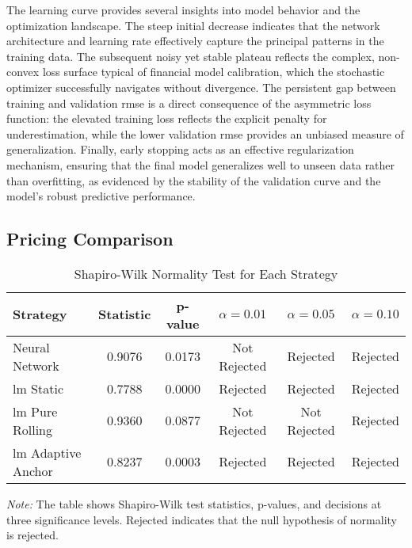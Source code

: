 The learning curve provides several insights into model behavior and the optimization landscape. The steep initial decrease indicates that the network architecture and learning rate effectively capture the principal patterns in the training data. The subsequent noisy yet stable plateau reflects the complex, non-convex loss surface typical of financial model calibration, which the stochastic optimizer successfully navigates without divergence. The persistent gap between training and validation \ac{rmse} is a direct consequence of the asymmetric loss function: the elevated training loss reflects the explicit penalty for underestimation, while the lower validation \ac{rmse} provides an unbiased measure of generalization. Finally, early stopping acts as an effective regularization mechanism, ensuring that the final model generalizes well to unseen data rather than overfitting, as evidenced by the stability of the validation curve and the model's robust predictive performance.

\subsection{Pricing Comparison}
\label{appendix:hypothesis_tests}
\begin{table}[H]
	\centering
	\begin{threeparttable}
		\caption{Shapiro-Wilk Normality Test for Each Strategy}
		\label{tab:shapiro_wilk}
		\begin{tabular}{lccccc}
			\toprule
			Strategy           & Statistic & p-value & $\alpha=0.01$ & $\alpha=0.05$ & $\alpha=0.10$ \\
			\midrule
			Neural Network     & 0.9076    & 0.0173  & Not Rejected  & Rejected      & Rejected      \\
			\ac{lm} Static          & 0.7788    & 0.0000  & Rejected      & Rejected      & Rejected      \\
			\ac{lm} Pure Rolling    & 0.9360    & 0.0877  & Not Rejected  & Not Rejected  & Rejected      \\
			\ac{lm} Adaptive Anchor & 0.8237    & 0.0003  & Rejected      & Rejected      & Rejected      \\
			\bottomrule
		\end{tabular}
		\begin{tablenotes}
			\footnotesize
			\item \textit{Note:} The table shows Shapiro-Wilk test statistics, p-values, and decisions at three significance levels. Rejected indicates that the null hypothesis of normality is rejected.
		\end{tablenotes}
	\end{threeparttable}
\end{table}

